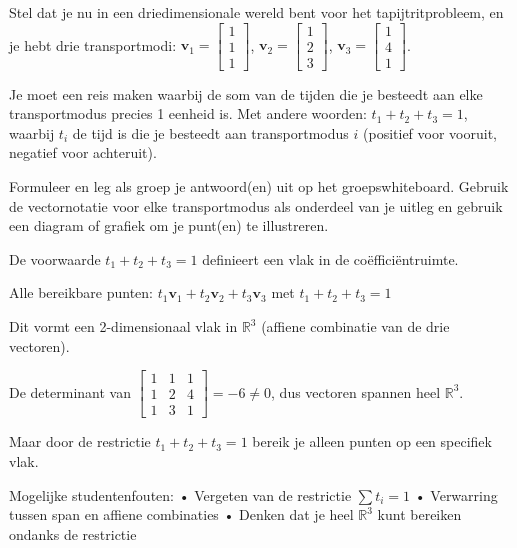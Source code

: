 \documentclass{ximera}
\begin{document}
\begin{problem}
Stel dat je nu in een driedimensionale wereld bent voor het tapijtritprobleem, en je hebt drie transportmodi: $\mathbf{v}_1 = \begin{bmatrix} 1 \\ 1 \\ 1 \end{bmatrix}$, $\mathbf{v}_2 = \begin{bmatrix} 1 \\ 2 \\ 3 \end{bmatrix}$, $\mathbf{v}_3 = \begin{bmatrix} 1 \\ 4 \\ 1 \end{bmatrix}$.

Je moet een reis maken waarbij de som van de tijden die je besteedt aan elke transportmodus precies 1 eenheid is. Met andere woorden: $t_1 + t_2 + t_3 = 1$, waarbij $t_i$ de tijd is die je besteedt aan transportmodus $i$ (positief voor vooruit, negatief voor achteruit).

Formuleer en leg als groep je antwoord(en) uit op het groepswhiteboard. Gebruik de vectornotatie voor elke transportmodus als onderdeel van je uitleg en gebruik een diagram of grafiek om je punt(en) te illustreren.

\begin{freeResponse}
De voorwaarde $t_1 + t_2 + t_3 = 1$ definieert een vlak in de coëfficiëntruimte.

Alle bereikbare punten: $t_1\mathbf{v}_1 + t_2\mathbf{v}_2 + t_3\mathbf{v}_3$ met $t_1 + t_2 + t_3 = 1$

Dit vormt een 2-dimensionaal vlak in $\mathbb{R}^3$ (affiene combinatie van de drie vectoren).

De determinant van $\begin{bmatrix} 1 & 1 & 1 \\ 1 & 2 & 4 \\ 1 & 3 & 1 \end{bmatrix} = -6 \neq 0$, dus vectoren spannen heel $\mathbb{R}^3$.

Maar door de restrictie $t_1 + t_2 + t_3 = 1$ bereik je alleen punten op een specifiek vlak.

Mogelijke studentenfouten:
• Vergeten van de restrictie $\sum t_i = 1$
• Verwarring tussen span en affiene combinaties
• Denken dat je heel $\mathbb{R}^3$ kunt bereiken ondanks de restrictie
\end{freeResponse}
\end{problem}
\end{document}
